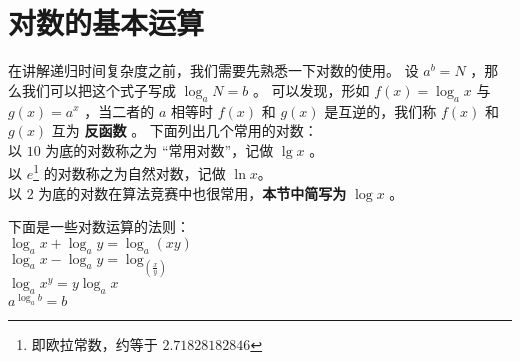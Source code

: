 \documentclass{beamer}
\newcommand{\fdf}[1]{\alert{\textbf{#1}}}
\begin{document}
\section{对数的基本运算}
\begin{frame}
在讲解递归时间复杂度之前，我们需要先熟悉一下对数的使用。
设 $a^b = N$ ，那么我们可以把这个式子写成 $\log_{a}N = b$ 。
可以发现，形如 $f(x) = \log_a x$ 与 $g(x) = a^x$ ，当二者的 $a$ 相等时 $f(x)$ 和 $g(x)$ 是互逆的，我们称 $f(x)$ 和 $g(x)$ 互为 \fdf{反函数} 。
下面列出几个常用的对数：\\
以 $10$ 为底的对数称之为 “常用对数”，记做 $\lg x$ 。\\
以 $e$\footnote{即欧拉常数，约等于 $2.71828182846$} 的对数称之为自然对数，记做 $\ln x$。\\
以 $2$ 为底的对数在算法竞赛中也很常用，\fdf{本节中简写为} $\log x$ 。
\end{frame}
\begin{frame}
下面是一些对数运算的法则：\\
$\log_a x + \log_a y = \log_a (xy)$  \\ 
$\log_a x - \log_a y = \log_ (\frac{x}{y})$ \\ 
$\log_a x^y = y \log_a x$ \\ 
$a^{\log_a b} = b$  \\ 
\end{frame}
\end{document}

